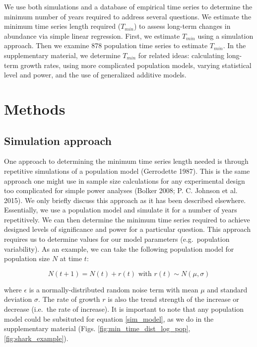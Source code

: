 \documentclass[12pt,]{article}
\begin{document}
We use both simulations and a database of empirical time series to
determine the minimum number of years required to address several
questions. We estimate the minimum time series length required
(\(T_{min}\)) to assess long-term changes in abundance via simple linear
regression. First, we estimate \(T_{min}\) using a simulation approach.
Then we examine 878 population time series to estimate \(T_{min}\). In
the supplementary material, we determine \(T_{min}\) for related ideas:
calculating long-term growth rates, using more complicated population
models, varying statistical level and power, and the use of generalized
additive models.

\section{Methods}\label{methods}

\subsection{Simulation approach}\label{simulation-approach}

One approach to determining the minimum time series length needed is
through repetitive simulations of a population model (Gerrodette 1987).
This is the same approach one might use in sample size calculations for
any experimental design too complicated for simple power analyses
(Bolker 2008; P. C. Johnson et al. 2015). We only briefly discuss this
approach as it has been described elsewhere. Essentially, we use a
population model and simulate it for a number of years repetitively. We
can then determine the minimum time series required to achieve designed
levels of significance and power for a particular question. This
approach requires us to determine values for our model parameters
(e.g.~population variability). As an example, we can take the following
population model for population size \(N\) at time \(t\):

\begin{equation}
N(t + 1) = N(t) + r(t) \mbox{ with } r(t) \sim N(\mu, \sigma)
\label{sim_model}
\end{equation}

where \(\epsilon\) is a normally-distributed random noise term with mean
\(\mu\) and standard deviation \(\sigma\). The rate of growth \(r\) is
also the trend strength of the increase or decrease (i.e.~the rate of
increase). It is important to note that any population model could be
subsituted for equation \ref{sim_model}, as we do in the supplementary
material (Figs. \ref{fig:min_time_dist_log_pop},
\ref{fig:shark_example}).
\end{document}
